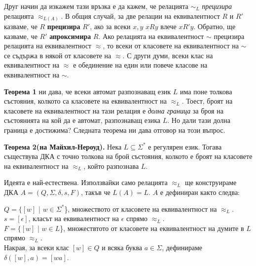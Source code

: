 \documentclass[openany]{book}
\begin{document}
            \vspace{15pt}
        
            \hspace{15pt} Друг начин да изкажем тази връзка е да кажем, че релацията $\sim_L$ 
            \textit{прецизира} релацията $\approx_{L(A)}$. В общия случай, за две релации
            на еквивалентност $R$ и $R'$ казваме, че $R$ \textbf{прецизира} $R'$, ако за всеки
            $x,y$ $xRy$ влече $xR'y$. Обратно, ще казваме, че $R'$ \textbf{апроксимира} $R$.
            Ако релацията на еквивалентност $\sim$ прецизира релацията
            на еквивалентност $\approx$, то всеки от класовете на еквивалентност на $\sim$ се
            съдържа в някой от класовете на $\approx$. С други думи, всеки клас на еквивалентност
            на $\approx$ е обединение на един или повече класове на еквивалентност на $\sim$.
        
            \vspace{15pt}
        
            \hspace{15pt} \textbf{Теорема 1} ни дава, че всеки автомат разпознаващ език $L$ има
            поне толкова състояния, колкото са класовете на еквивалентност на $\approx_L$.
            Тоест, броят на класовете на еквивалентност на тази релация е \textit{долна граница}
            за броя на състоянията на кой да е автомат, разпознаващ езика $L$. Но дали тази
            долна граница е достижима? Следната теорема ни дава отговор на този въпрос. \\
            
            \vspace{15pt}
        
            \textbf{Теорема 2(на Майхил-Нероуд).} Нека $L \subseteq \Sigma^*$ е регулярен език.
            Тогава съществува ДКА с точно толкова на брой състояния, колкото е броят на 
            класовете на еквивалентност на $\approx_L$, който разпознава $L$.
        
            \vspace{15pt}
        
            \hspace{15pt} Идеята е най-естествена. Използвайки само релацията $\approx_L$ ще 
            конструираме ДКА $A = (Q,\Sigma,\delta,s,F)$, такъв че $L(A) = L$. $A$ е 
            дефиниран както следва:
            \begin{center}
                $Q = \{[w]$ | $w \in \Sigma^*$\}, множеството от класовете на еквивалентност 
                на $\approx_L$. \\
                $s = [\epsilon]$, класът на еквивалентност на $\epsilon$ спрямо $\approx_L$. \\
                $F = \{[w]$ | $w \in L$\}, множествтото от класовете на еквивалентност на думите
                в $L$ спрямо $\approx_L$. \\
                Накрая, за всеки клас $[w] \in Q$ и всяка буква $a \in \Sigma$, дефинираме
                $\delta([w],a) = [wa]$. 
            \end{center}
        
\end{document}
